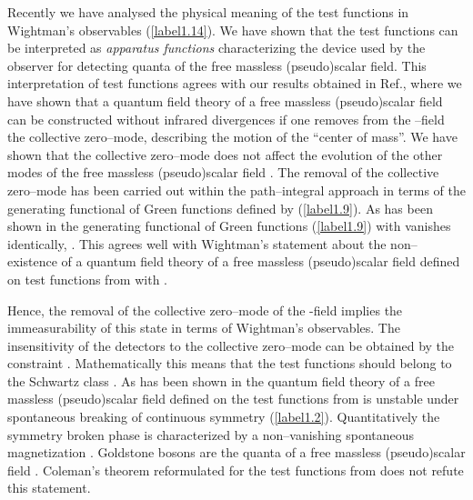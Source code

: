 \documentclass[a4paper,12pt] {article}
\begin{document}
Recently \cite{th0204237,th0206244} we have analysed the physical
meaning of the test functions \coordHE{} in Wightman's observables
(\ref{label1.14}). We have shown that the test functions can be
interpreted as {\it apparatus functions} characterizing the device
used by the observer for detecting quanta of the free massless
(pseudo)scalar field. This interpretation of test functions agrees
with our results obtained in Ref.\cite{th0112184}, where we have shown
that a quantum field theory of a free massless (pseudo)scalar field
\coordHE{} can be constructed without infrared divergences if one
removes from the \myHighlight{$\vartheta$}\coordHE{}--field the collective zero--mode,
describing the motion of the ``center of mass''. We have shown that
the collective zero--mode does not affect the evolution of the other
modes of the free massless (pseudo)scalar field \coordHE{}. The
removal of the collective zero--mode has been carried out within the
path--integral approach in terms of the generating functional of Green
functions defined by (\ref{label1.9}). As has been shown in
\cite{th0112184} the generating functional of Green functions
(\ref{label1.9}) with \coordHE{} vanishes identically,
\coordHE{}. This agrees well with Wightman's statement \cite{Wi64}
about the non--existence of a quantum field theory of a free massless
(pseudo)scalar field defined on test functions \coordHE{} from \coordHE{} with \coordHE{}.

Hence, the removal of the collective zero--mode of the
\coordHE{}-field implies the immeasurability of this state in
terms of Wightman's observables.  The insensitivity of the detectors
to the collective zero--mode can be obtained by the constraint
\coordHE{} \cite{th0204237,th0206244}. Mathematically this
means that the test functions \coordHE{} should belong to the Schwartz
class \coordHE{}
\cite{th0112184,th0204237,th0206244}. As has been shown in
\cite{th0204237,th0206244} the quantum field theory of a free massless
(pseudo)scalar field \coordHE{} defined on the test functions from
\coordHE{} is unstable under spontaneous breaking
of continuous symmetry (\ref{label1.2}). Quantitatively the symmetry
broken phase is characterized by a non--vanishing spontaneous
magnetization \coordHE{} \cite{th0112184,th0204237,th0206244}.
Goldstone bosons are the quanta of a free massless (pseudo)scalar
field \cite{th0112184,th0204237,th0206244}. Coleman's theorem
reformulated for the test functions from \coordHE{} does
not refute this statement.
\end{document}
